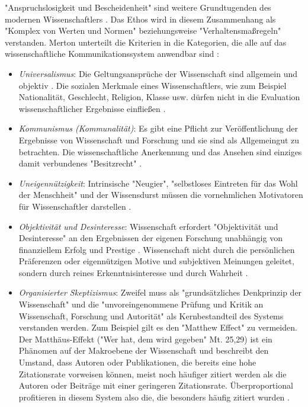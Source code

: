 "Anspruchslosigkeit und Bescheidenheit" sind weitere Grundtugenden des modernen Wissenschaftlers \cite{hagner_2015_sache_buches}. Das Ethos wird in diesem Zusammenhang als "Komplex von Werten und Normen" \cite{suchen} beziehungsweise "Verhaltensmaßregeln" \cite{suchen} verstanden. Merton unterteilt die Kriterien in die Kategorien, die alle auf das wissenschaftliche Kommunikationssystem anwendbar sind  \cite{Fröhlich_oa_2009}:
\begin{itemize}
\item \textit{Universalismus}: Die Geltungsansprüche der Wissenschaft sind allgemein und objektiv \cite{Oezmen_2015}. Die sozialen Merkmale eines Wissenschaftlers, wie zum Beispiel Nationalität, Geschlecht, Religion, Klasse usw. dürfen nicht in die Evaluation wissenschaftlicher Ergebnisse einfließen \cite{suchen}.
\item \textit{Kommunismus (Kommunalität)}: Es gibt eine Pflicht zur Veröffentlichung der Ergebnisse von Wissenschaft und Forschung und sie sind als Allgemeingut zu betrachten. Die wissenschaftliche Anerkennung und das Ansehen sind einziges damit verbundenes "Besitzrecht" \cite{suchen}.
\item \textit{Uneigennützigkeit}: Intrinsische "Neugier"\cite{suchen}, "selbstloses Eintreten für das Wohl der Menschheit"\cite{suchen} und der Wissensdurst müssen die vornehmlichen Motivatoren für Wissenschaftler darstellen \cite{suchen}.
\item \textit{Objektivität und Desinteresse}: Wissenschaft erfordert "Objektivität und Desinteresse" an den Ergebnissen der eigenen Forschung \cite{suchen} unabhängig von finanziellem Erfolg und Prestige \cite{suchen}. Wissenschaft nicht durch die persönlichen Präferenzen oder eigennützigen Motive und subjektiven Meinungen geleitet, sondern durch reines Erkenntnisinteresse und durch Wahrheit \cite{Oezmen_2015}.
\item \textit{Organisierter Skeptizismus}: Zweifel muss als "grundsätzliches Denkprinzip der Wissenschaft" \cite{suchen} und die "unvoreingenommene Prüfung und Kritik an Wissenschaft, Forschung und Autorität" \cite{suchen} als Kernbestandteil des Systems verstanden werden. Zum Beispiel gilt es den "Matthew Effect" zu vermeiden. Der Matthäus-Effekt ("Wer hat, dem wird gegeben" Mt. 25,29) ist ein Phänomen auf der Makroebene der Wissenschaft \cite{bonitz_1998_matthaus} und  beschreibt den Umstand, dass Autoren oder Publikationen, die bereits eine hohe Zitationsrate vorweisen können, meist noch häufiger zitiert werden als die Autoren oder Beiträge mit einer geringeren Zitationsrate. Überproportional profitieren in diesem System also die, die besonders häufig zitiert wurden \cite{Merton_1968} \cite{meier_2009_matthaus}.
\end{itemize}

